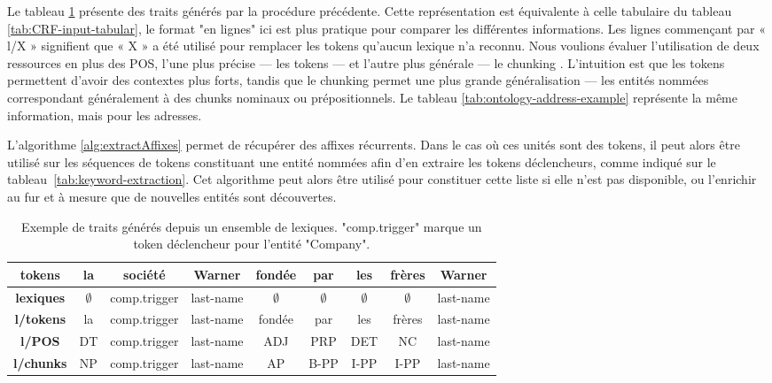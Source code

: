 \documentclass[PhD-Yoann-Dupont.tex]{subfiles}
\begin{document}
Le tableau \ref{tab:ontology-company-vs-person} présente des traits générés par la procédure précédente. Cette représentation est équivalente à celle tabulaire du tableau \ref{tab:CRF-input-tabular}, le format "en lignes" ici est plus pratique pour comparer les différentes informations. Les lignes commençant par « l/X » signifient que « X » a été utilisé pour remplacer les tokens qu'aucun lexique n'a reconnu. Nous voulions évaluer l'utilisation de deux ressources en plus des POS, l'une plus précise — les tokens — et l'autre plus générale — le chunking \citep{Abney91}. L'intuition est que les tokens permettent d'avoir des contextes plus forts, tandis que le chunking permet une plus grande généralisation — les entités nommées correspondant généralement à des chunks nominaux ou prépositionnels. Le tableau \ref{tab:ontology-address-example} représente la même information, mais pour les adresses.

L'algorithme \ref{alg:extractAffixes} permet de récupérer des affixes récurrents. Dans le cas où ces unités sont des tokens, il peut alors être utilisé sur les séquences de tokens constituant une entité nommées afin d'en extraire les tokens déclencheurs, comme indiqué sur le tableau\ \ref{tab:keyword-extraction}. Cet algorithme peut alors être utilisé pour constituer cette liste si elle n'est pas disponible, ou l'enrichir au fur et à mesure que de nouvelles entités sont découvertes.

\begin{table}[ht!]
\centering
\begin{tabular}{|c|cccccccc|}
\hline
\textbf{tokens}      & la          & société         & Warner       & fondée          & par         & les         & frères      & Warner \\
\hline
\textbf{lexiques} & $\emptyset$  & comp.trigger & last-name    & $\emptyset$     & $\emptyset$ & $\emptyset$ & $\emptyset$ & last-name \\
\textbf{l/tokens}    & la          & comp.trigger & last-name    & fondée          & par         & les         & frères      & last-name \\
\textbf{l/POS}     & DT          & comp.trigger & last-name    & ADJ             & PRP         & DET         & NC          & last-name \\
\textbf{l/chunks}  & NP          & comp.trigger & last-name    & AP              & B-PP        & I-PP        & I-PP        & last-name \\
\hline
\end{tabular}
\caption{Exemple de traits générés depuis un ensemble de lexiques. "comp.trigger" marque un token déclencheur pour l'entité "Company".}
\label{tab:ontology-company-vs-person}
\end{table}
\end{document}
